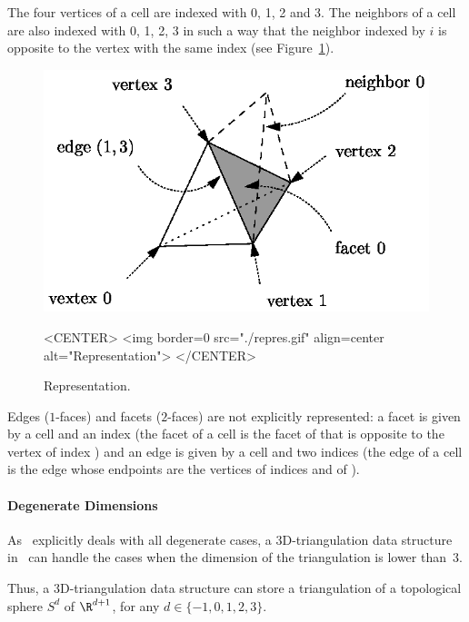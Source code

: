 The four vertices of a cell are indexed with 0, 1, 2 and 3.  The
neighbors of a cell are also indexed with 0, 1, 2, 3 
in such a way that the neighbor indexed by $i$ is opposite to the vertex
with the same index (see Figure~\ref{TDS3-fig-repres}).

\begin{figure}
\begin{ccTexOnly}
\begin{center} 
\includegraphics{repres.eps}
\end{center}
\end{ccTexOnly}
\caption{Representation.
\label{TDS3-fig-repres}}
\begin{ccHtmlOnly}
<CENTER>
<img border=0 src="./repres.gif" align=center
alt="Representation">
</CENTER>
\end{ccHtmlOnly}
\end{figure} 

Edges ($1$-faces) and facets ($2$-faces) are not explicitly
represented: a facet is given by a cell and an index (the facet
 of a cell  is the facet of  that is opposite to
the vertex of index ) and an edge is given by a cell and two
indices (the edge  of a cell  is the edge
whose endpoints are the vertices of indices  and  of
). 

\paragraph{Degenerate Dimensions}
As \cgal\ explicitly deals with all degenerate cases, a
3D-triangulation data structure in \cgal\ can handle the cases when
the dimension of the triangulation is lower than~3.

Thus, a 3D-triangulation data structure can store a triangulation of a
topological sphere $S^d$ of $\R^{d+1}$, for any $d \in \{-1,0,1,2,3\}$. 

